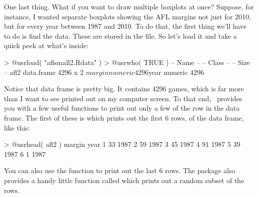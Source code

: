 One last thing. What if you want to draw multiple boxplots at once? Suppose, for instance, I wanted separate boxplots showing the AFL margins not just for 2010, but for every year between 1987 and 2010. To do that, the first thing we'll have to do is find the data. These are stored in the  file. So let's load it and take a quick peek at what's inside:
\begin{rblock1}
> @usr{load( "aflsmall2.Rdata" )}
> @usr{who( TRUE )}
   -- Name --   -- Class --   -- Size --
   afl2         data.frame    4296 x 2  
    $margin     numeric       4296      
    $year       numeric       4296     
\end{rblock1}
Notice that  data frame is pretty big. It contains 4296 games, which is far more than I want to see printed out on my computer screen. To that end, \R\ provides you with a few useful functions to print out only a few of the row in the data frame. The first of these is  which prints out the first 6 rows, of the data frame, like this:
\begin{rblock1}           
> @usr{head( afl2 )}
  margin year
1     33 1987
2     59 1987
3     45 1987
4     91 1987
5     39 1987
6      1 1987
\end{rblock1}
You can also use the  function to print out the last 6 rows. The  package also provides a handy little function called  which prints out a random subset of the rows. 

